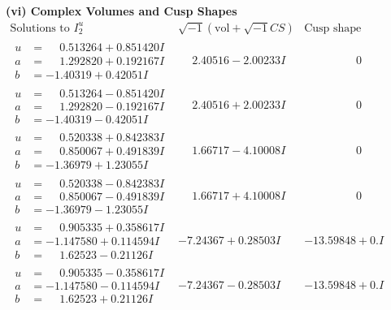 \documentclass[1p]{elsarticle_modified}
\theoremstyle{definition}
\newcommand{\I}{\sqrt{-1}}
\begin{document}
\newpage\flushleft \textbf{(vi) Complex Volumes and Cusp Shapes}
$$\begin{array}{c|c|c}  
\text{Solutions to }I^u_{2}& \I (\text{vol} + \sqrt{-1}CS) & \text{Cusp shape}\\
 \hline 
\begin{aligned}
u &= \phantom{-}0.513264 + 0.851420 I \\
a &= \phantom{-}1.292820 + 0.192167 I \\
b &= -1.40319 + 0.42051 I\end{aligned}
 & \phantom{-}2.40516 - 2.00233 I & \phantom{-0.000000 } 0 \\ \hline\begin{aligned}
u &= \phantom{-}0.513264 - 0.851420 I \\
a &= \phantom{-}1.292820 - 0.192167 I \\
b &= -1.40319 - 0.42051 I\end{aligned}
 & \phantom{-}2.40516 + 2.00233 I & \phantom{-0.000000 } 0 \\ \hline\begin{aligned}
u &= \phantom{-}0.520338 + 0.842383 I \\
a &= \phantom{-}0.850067 + 0.491839 I \\
b &= -1.36979 + 1.23055 I\end{aligned}
 & \phantom{-}1.66717 - 4.10008 I & \phantom{-0.000000 } 0 \\ \hline\begin{aligned}
u &= \phantom{-}0.520338 - 0.842383 I \\
a &= \phantom{-}0.850067 - 0.491839 I \\
b &= -1.36979 - 1.23055 I\end{aligned}
 & \phantom{-}1.66717 + 4.10008 I & \phantom{-0.000000 } 0 \\ \hline\begin{aligned}
u &= \phantom{-}0.905335 + 0.358617 I \\
a &= -1.147580 + 0.114594 I \\
b &= \phantom{-}1.62523 - 0.21126 I\end{aligned}
 & -7.24367 + 0.28503 I & -13.59848 + 0. I\phantom{ +0.000000I} \\ \hline\begin{aligned}
u &= \phantom{-}0.905335 - 0.358617 I \\
a &= -1.147580 - 0.114594 I \\
b &= \phantom{-}1.62523 + 0.21126 I\end{aligned}
 & -7.24367 - 0.28503 I & -13.59848 + 0. I\phantom{ +0.000000I} \\ \hline\begin{aligned}

\end{aligned}
\end{array}$$
\end{document}
